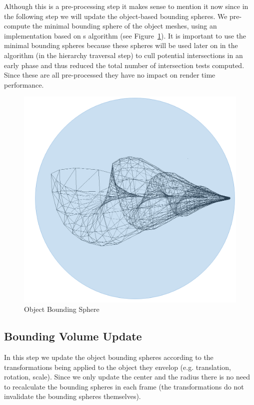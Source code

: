 Although this is a pre-processing step it makes sense to mention it now since in the following step we will update the object-based bounding spheres. We pre-compute the minimal bounding sphere of the object meshes, using an implementation based on \cite{Gartner99}s algorithm (see Figure~\ref{fig:obs}). It is important to use the minimal bounding spheres because these spheres will be used later on in the algorithm (in the hierarchy traversal step) to cull potential intersections in an early phase and thus reduced the total number of intersection tests computed. Since these are all pre-processed they have no impact on render time performance.

\begin{figure}[!htb]
    \centering
    \includegraphics[scale=0.20]{Images/Object_Bounding_Sphere}
    \caption{\label{fig:obs}Object Bounding Sphere}
\end{figure}

\subsection{Bounding Volume Update}

In this step we update the object bounding spheres according to the transformations being applied to the object they envelop (e.g. translation, rotation, scale). Since we only update the center and the radius there is no need to recalculate the bounding spheres in each frame (the transformations do not invalidate the bounding spheres themselves).

